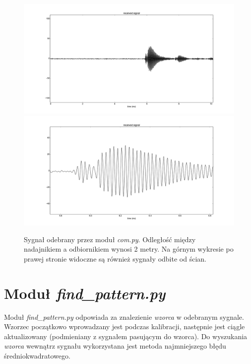 \begin{figure}[h!]
    \centering
    \includegraphics[width=1.15\textwidth, trim= 47mm 0mm 0mm 0mm,clip]{com_output_2m_1}
    \includegraphics[width=1.15\textwidth, trim= 47mm 0mm 0mm 0mm,clip]{com_output_2m_2}
    \caption{Sygnał odebrany przez moduł \textit{com.py}. 
    Odległość między nadajnikiem a odbiornikiem wynosi 2 metry.
    Na górnym wykresie po prawej stronie widoczne są również sygnały odbite od ścian.
    }
    \label{fig:com_output_2m}
\end{figure}


\section{Moduł \textit{find\_pattern.py}}

Moduł \textit{find\_pattern.py} odpowiada za znalezienie \textit{wzorca} w odebranym sygnale.
Wzorzec początkowo wprowadzany jest podczas kalibracji, następnie jest ciągle aktualizowany 
(podmieniany z sygnałem pasującym do wzorca).
Do wyszukania \textit{wzorca} wewnątrz sygnału wykorzystana jest metoda najmniejszego błędu średniokwadratowego.

